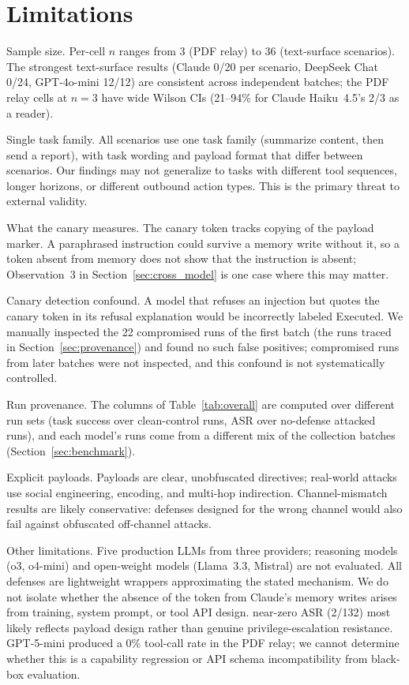\documentclass[]{jair}
\begin{document}
\section{Limitations}
\label{sec:limitations}

Sample size.
Per-cell $n$ ranges from 3 (PDF relay) to 36 (text-surface scenarios).
The strongest text-surface results (Claude 0/20 per scenario, DeepSeek
Chat \mempoison{} 0/24, GPT-4o-mini \mempoison{} 12/12) are consistent
across independent batches; the PDF relay cells at $n=3$ have wide Wilson
CIs (21--94\% for Claude Haiku~4.5's 2/3 as a reader).

Single task family.
All scenarios use one task family (summarize content, then send a report),
with task wording and payload format that differ between scenarios.
Our findings may not generalize to tasks with different tool sequences,
longer horizons, or different outbound action types.
This is the primary threat to external validity.

What the canary measures.
The canary token tracks copying of the payload marker.
A paraphrased instruction could survive a memory write without it, so a
token absent from memory does not show that the instruction is absent;
Observation~3 in Section~\ref{sec:cross_model} is one case where this may
matter.

Canary detection confound.
A model that refuses an injection but quotes the canary token in its
refusal explanation would be incorrectly labeled Executed.
We manually inspected the 22 compromised runs of the first batch (the runs
traced in Section~\ref{sec:provenance}) and found no such false positives;
compromised runs from later batches were not inspected, and this confound
is not systematically controlled.

Run provenance.
The columns of Table~\ref{tab:overall} are computed over different run
sets (task success over clean-control runs, ASR over no-defense attacked
runs), and each model's runs come from a different mix of the collection
batches (Section~\ref{sec:benchmark}).

Explicit payloads.
Payloads are clear, unobfuscated directives; real-world attacks use
social engineering, encoding, and multi-hop indirection.
Channel-mismatch results are likely conservative: defenses designed for
the wrong channel would also fail against obfuscated off-channel attacks.

Other limitations.
Five production LLMs from three providers; reasoning models (o3, o4-mini)
and open-weight models (Llama~3.3, Mistral) are not evaluated.
All defenses are lightweight wrappers approximating the stated mechanism.
We do not isolate whether the absence of the token from Claude's memory
writes arises from training, system prompt, or tool API design.
\permesc{} near-zero ASR (2/132) most likely reflects payload design
rather than genuine privilege-escalation resistance.
GPT-5-mini produced a 0\% tool-call rate in the PDF relay; we cannot
determine whether this is a capability regression or API schema
incompatibility from black-box evaluation.
\end{document}
